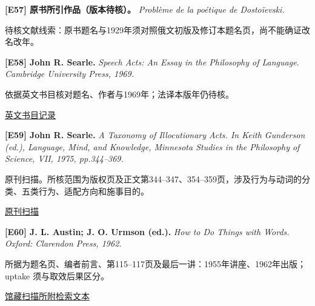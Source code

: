 \par\noindent\begin{minipage}{\linewidth}
\label{ref-57}\noindent\textbf{[E57] 原书所引作品（版本待核）。} \textit{Problème de la poétique de Dostoïevski.}\par\nobreak
待核文献线索：原书题名与1929年须对照俄文初版及修订本题名页，尚不能确证改名改年。\par
\par\end{minipage}\par

\par\noindent\begin{minipage}{\linewidth}
\label{ref-58}\noindent\textbf{[E58] John R. Searle.} \textit{Speech Acts: An Essay in the Philosophy of Language. Cambridge University Press, 1969.}\par\nobreak
依据英文书目核对题名、作者与1969年；法译本版年仍待核。\par
{\small\href{https://books.google.com/books/about/Speech_Acts.html?id=t3_WhfknvF0C}{英文书目记录}}\par
\par\end{minipage}\par

\par\noindent\begin{minipage}{\linewidth}
\label{ref-59}\noindent\textbf{[E59] John R. Searle.} \textit{A Taxonomy of Illocutionary Acts. In Keith Gunderson (ed.), Language, Mind, and Knowledge, Minnesota Studies in the Philosophy of Science, VII, 1975, pp.344–369.}\par\nobreak
原刊扫描。所核范围为版权页及正文第344–347、354–359页，涉及行为与动词的分类、五类行为、适配方向和施事目的。\par
{\small\href{https://semantics.uchicago.edu/kennedy/classes/f09/semprag1/searle75a.pdf}{原刊扫描}}\par
\par\end{minipage}\par

\par\noindent\begin{minipage}{\linewidth}
\label{ref-60}\noindent\textbf{[E60] J. L. Austin; J. O. Urmson (ed.).} \textit{How to Do Things with Words. Oxford: Clarendon Press, 1962.}\par\nobreak
所据为题名页、编者前言、第115–117页及最后一讲：1955年讲座、1962年出版；uptake 须与取效后果区分。\par
{\small\href{https://archive.org/stream/austin-how-to-do-things-with-words/Austin,%20how%20to%20do%20things%20with%20words_djvu.txt}{馆藏扫描所附检索文本}}\par
\par\end{minipage}\par

